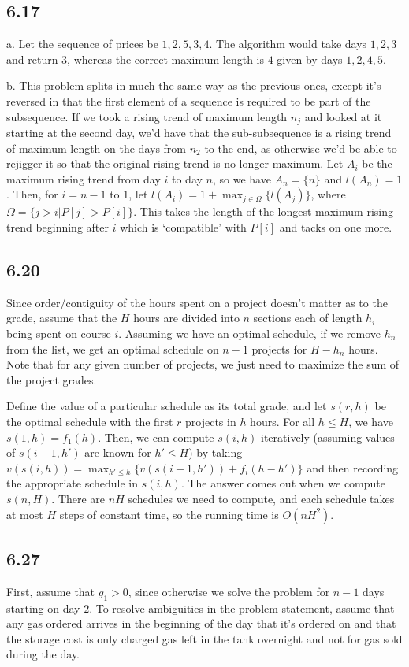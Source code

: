 \documentclass{article}
\begin{document}
\subsection*{6.17}
a. Let the sequence of prices be $1,2,5,3,4$. The algorithm would take days $1,2,3$ and return $3$, whereas the correct maximum length is $4$ given by days $1,2,4,5$.

\noindent b. This problem splits in much the same way as the previous ones, except it's reversed in that the first element of a sequence is required to be part of the subsequence. If we took a rising trend of maximum length $n_j$ and looked at it starting at the second day, we'd have that the sub-subsequence is a rising trend of maximum length on the days from $n_2$ to the end, as otherwise we'd be able to rejigger it so that the original rising trend is no longer maximum. Let $A_i$ be the maximum rising trend from day $i$ to day $n$, so we have $A_n=\{n\}$ and $l(A_n)=1$. Then, for $i=n-1$ to $1$, let $\displaystyle l(A_i)=1+\max_{j\in \Omega}\{l(A_j)\}$, where $\Omega=\{j>i|P[j]>P[i]\}$. This takes the length of the longest maximum rising trend beginning after $i$ which is `compatible' with $P[i]$ and tacks on one more.
\subsection*{6.20}

Since order/contiguity of the hours spent on a project doesn't matter as to the grade, assume that the $H$ hours are divided into $n$ sections each of length $h_i$ being spent on course $i$. Assuming we have an optimal schedule, if we remove $h_n$ from the list, we get an optimal schedule on $n-1$ projects for $H-h_n$ hours. Note that for any given number of projects, we just need to maximize the sum of the project grades. 

Define the value of a particular schedule as its total grade, and let $s(r,h)$ be the optimal schedule with the first $r$ projects in $h$ hours. For all $h\leq H$, we have $s(1,h)=f_1(h)$. Then, we can compute $s(i,h)$ iteratively (assuming values of $s(i-1,h')$ are known for $h'\leq H$) by taking $\displaystyle v(s(i,h))=\max_{h'\leq h}\{v(s(i-1,h'))+f_i(h-h')\}$ and then recording the appropriate schedule in $s(i,h)$. The answer comes out when we compute $s(n,H)$. There are $nH$ schedules we need to compute, and each schedule takes at most $H$ steps of constant time, so the running time is $O(nH^2)$.
\subsection*{6.27}
First, assume that $g_1>0$, since otherwise we solve the problem for $n-1$ days starting on day $2$. To resolve ambiguities in the problem statement, assume that any gas ordered arrives in the beginning of the day that it's ordered on and that the storage cost is only charged gas left in the tank overnight and not for gas sold during the day.
\end{document}
